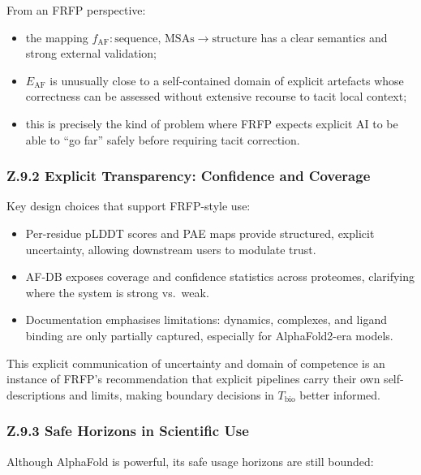 From an FRFP perspective:

\begin{itemize}
  \item the mapping
        \(
          f_{\mathrm{AF}} : \text{sequence, MSAs} \to \text{structure}
        \)
        has a clear semantics and strong external validation;
  \item $E_{\mathrm{AF}}$ is unusually close to a self-contained domain of
        explicit artefacts whose correctness can be assessed without
        extensive recourse to tacit local context;
  \item this is precisely the kind of problem where FRFP expects explicit AI
        to be able to ``go far'' safely before requiring tacit correction.
\end{itemize}

\subsubsection*{Z.9.2 Explicit Transparency: Confidence and Coverage}

Key design choices that support FRFP-style use:

\begin{itemize}
  \item Per-residue pLDDT scores and PAE maps provide structured, explicit
        uncertainty, allowing downstream users to modulate trust.
  \item AF-DB exposes coverage and confidence statistics across proteomes,
        clarifying where the system is strong vs.\ weak.
  \item Documentation emphasises limitations: dynamics, complexes, and ligand
        binding are only partially captured, especially for AlphaFold2-era
        models.
\end{itemize}

This explicit communication of uncertainty and domain of competence is an
instance of FRFP’s recommendation that explicit pipelines carry their own
self-descriptions and limits, making boundary decisions in \(T_{\mathrm{bio}}\)
better informed.

\subsubsection*{Z.9.3 Safe Horizons in Scientific Use}

Although AlphaFold is powerful, its safe usage horizons are still bounded:

